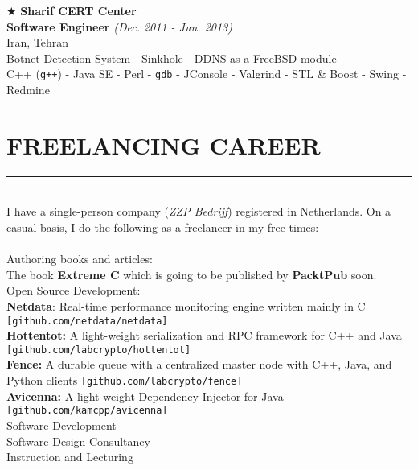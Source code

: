 \documentclass[10pt,a4paper]{article}
\begin{document}
\noindent $\bigstar$ \hspace{0.1cm} \large \textbf{Sharif CERT Center} \\ 
\indent \small \textbf{Software Engineer} \textsl{(Dec. 2011 - Jun. 2013)} \\
\indent \textnormal{Iran, Tehran} \\ 
\indent \textbullet \hspace{0.05cm} Botnet Detection System - Sinkhole - DDNS as a FreeBSD module \\
\indent \textbullet \hspace{0.05cm} C++ (\texttt{g++}) - Java SE - Perl - \texttt{gdb} - JConsole - Valgrind - STL \& Boost - Swing - Redmine \\

\section{FREELANCING CAREER}
\noindent \rule {18.0cm}{0.2pt} \\
I have a single-person company (\textit{ZZP Bedrijf}) registered in Netherlands. On a casual basis, I do the following as a freelancer in my free times: \\ \\
\textbullet \hspace{0.05cm} Authoring books and articles: \\
\indent \hspace{0.05cm} The book \textbf{Extreme C} which is going to be published by \textbf{PacktPub} soon. \\
\textbullet \hspace{0.05cm} Open Source Development:\\
\indent \hspace{0.05cm} \textbf{Netdata}: Real-time performance monitoring engine written mainly in C \texttt{[github.com/netdata/netdata]} \\
\indent \hspace{0.05cm} \textbf{Hottentot:} A light-weight serialization and RPC framework for C++ and Java \texttt{[github.com/labcrypto/hottentot]} \\
\indent \hspace{0.05cm} \textbf{Fence:} A durable queue with a centralized master node with C++, Java, and Python clients \texttt{[github.com/labcrypto/fence]} \\
\indent \hspace{0.05cm} \textbf{Avicenna:} A light-weight Dependency Injector for Java \texttt{[github.com/kamcpp/avicenna]} \\
\textbullet \hspace{0.05cm} Software Development  \\
\textbullet \hspace{0.05cm} Software Design Consultancy \\
\textbullet \hspace{0.05cm} Instruction and Lecturing \\
    
\end{document}
